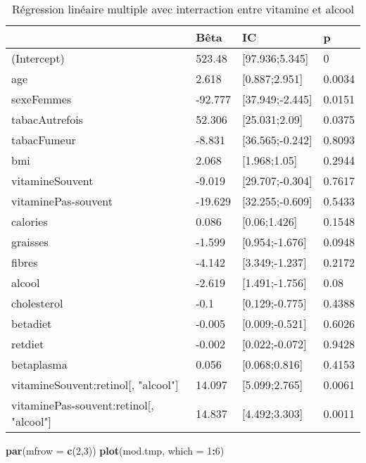 \documentclass[]{article}
\newenvironment{Shaded}{\begin{snugshade}}{\end{snugshade}}
\newcommand{\KeywordTok}[1]{\textcolor[rgb]{0.13,0.29,0.53}{\textbf{#1}}}
\newcommand{\DataTypeTok}[1]{\textcolor[rgb]{0.13,0.29,0.53}{#1}}
\newcommand{\DecValTok}[1]{\textcolor[rgb]{0.00,0.00,0.81}{#1}}
\newcommand{\OperatorTok}[1]{\textcolor[rgb]{0.81,0.36,0.00}{\textbf{#1}}}
\newcommand{\NormalTok}[1]{#1}
\begin{document}
\begin{table}

\caption{\label{tab:unnamed-chunk-73}Régression linéaire multiple avec interraction entre vitamine et alcool}
\centering
\begin{tabular}[t]{l|l|l|l}
\hline
  & Bêta & IC & p\\
\hline
\rowcolor[HTML]{BBD2E1}  (Intercept) & 523.48 & [97.936;5.345] & 0\\
\hline
age & 2.618 & [0.887;2.951] & 0.0034\\
\hline
\rowcolor[HTML]{BBD2E1}  sexeFemmes & -92.777 & [37.949;-2.445] & 0.0151\\
\hline
tabacAutrefois & 52.306 & [25.031;2.09] & 0.0375\\
\hline
\rowcolor[HTML]{BBD2E1}  tabacFumeur & -8.831 & [36.565;-0.242] & 0.8093\\
\hline
bmi & 2.068 & [1.968;1.05] & 0.2944\\
\hline
\rowcolor[HTML]{BBD2E1}  vitamineSouvent & -9.019 & [29.707;-0.304] & 0.7617\\
\hline
vitaminePas-souvent & -19.629 & [32.255;-0.609] & 0.5433\\
\hline
\rowcolor[HTML]{BBD2E1}  calories & 0.086 & [0.06;1.426] & 0.1548\\
\hline
graisses & -1.599 & [0.954;-1.676] & 0.0948\\
\hline
\rowcolor[HTML]{BBD2E1}  fibres & -4.142 & [3.349;-1.237] & 0.2172\\
\hline
alcool & -2.619 & [1.491;-1.756] & 0.08\\
\hline
\rowcolor[HTML]{BBD2E1}  cholesterol & -0.1 & [0.129;-0.775] & 0.4388\\
\hline
betadiet & -0.005 & [0.009;-0.521] & 0.6026\\
\hline
\rowcolor[HTML]{BBD2E1}  retdiet & -0.002 & [0.022;-0.072] & 0.9428\\
\hline
betaplasma & 0.056 & [0.068;0.816] & 0.4153\\
\hline
\rowcolor[HTML]{BBD2E1}  vitamineSouvent:retinol[, "alcool"] & 14.097 & [5.099;2.765] & 0.0061\\
\hline
vitaminePas-souvent:retinol[, "alcool"] & 14.837 & [4.492;3.303] & 0.0011\\
\hline
\end{tabular}
\end{table}

\begin{Shaded}
\begin{Highlighting}[]
\KeywordTok{par}\NormalTok{(}\DataTypeTok{mfrow =} \KeywordTok{c}\NormalTok{(}\DecValTok{2}\NormalTok{,}\DecValTok{3}\NormalTok{))}
\KeywordTok{plot}\NormalTok{(mod.tmp, }\DataTypeTok{which =} \DecValTok{1}\OperatorTok{:}\DecValTok{6}\NormalTok{)}
\end{Highlighting}
\end{Shaded}
\end{document}
